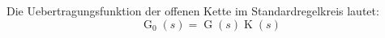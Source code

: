 Die Uebertragungsfunktion der offenen Kette im Standardregelkreis lautet:
$$\operatorname{G}_0(s) = \operatorname{G}(s) \operatorname{K}(s)$$
